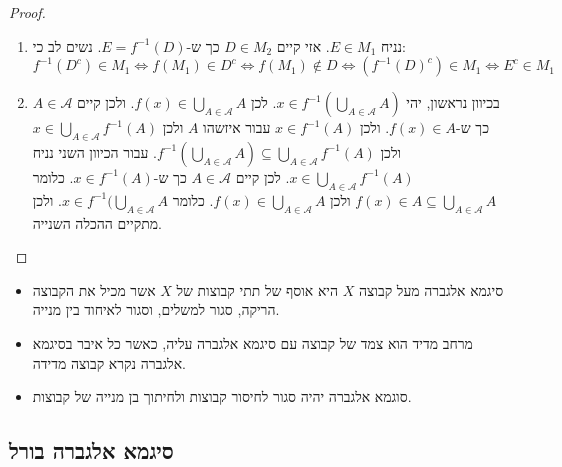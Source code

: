 \documentclass{tstextbook}
\begin{document}
\begin{proof}
  \begin{enumerate}
    \item נניח \(E \in M_{1}\). אזי קיים \(D \in M_{2}\) כך ש-\(E =f^{-1}(D)\). נשים לב כי: 
$$f^{-1}(D^{c})\in M_{1}\iff f(M_{1})\in D^{c}\iff f(M_{1})\not  \in D \iff \left( f^{-1}(D)^{c} \right)\in M_{1}\iff E^{c} \in M_{1}$$


    \item בכיוון נראשון, יהי \(x \in f^{-1}\left( \bigcup_{A \in \mathcal{A}}A \right)\). לכן \(f(x)\in \bigcup_{A \in \mathcal{A}}A\). ולכן קיים \(A \in \mathcal{A}\) כך ש-\(f(x) \in A\). ולכן \(x \in f^{-1}(A)\) עבור איזשהו \(A\) ולכן \(x \in \bigcup_{A\in\mathcal{A}}f^{-1}(A)\) ולכן \(f^{-1}\left( \bigcup_{A \in \mathcal{A}}A \right)\subseteq \bigcup_{A \in \mathcal{A}}f^{-1}(A)\). עבור הכיוון השני נניח \(x \in \bigcup_{A \in \mathcal{A}}f^{-1}(A)\). לכן קיים \(A \in \mathcal{A}\) כך ש-\(x \in f^{-1}(A)\). כלומר \(f(x)\in A\subseteq \bigcup_{A \in \mathcal{A}}A\) ולכן \(f(x)\in \bigcup_{A \in \mathcal{A}}A\). כלומר \(x \in f^{-1}(\bigcup_{A \in \mathcal{A}}A\). ולכן מתקיים ההכלה השנייה. 


  \end{enumerate}
\end{proof}
\begin{summary}
  \begin{itemize}
    \item סיגמא אלגברה מעל קבוצה \(X\) היא אוסף של תתי קבוצות של \(X\) אשר מכיל את הקבוצה הריקה, סגור למשלים, וסגור לאיחוד בין מנייה.
    \item מרחב מדיד הוא צמד של קבוצה עם סיגמא אלגברה עליה, כאשר כל איבר בסיגמא אלגברה נקרא קבוצה מדידה.
    \item סוגמא אלגברה יהיה סגור לחיסור קבוצות ולחיתוך בן מנייה של קבוצות.
  \end{itemize}
\end{summary}
\subsection{סיגמא אלגברה בורל}
\end{document}
